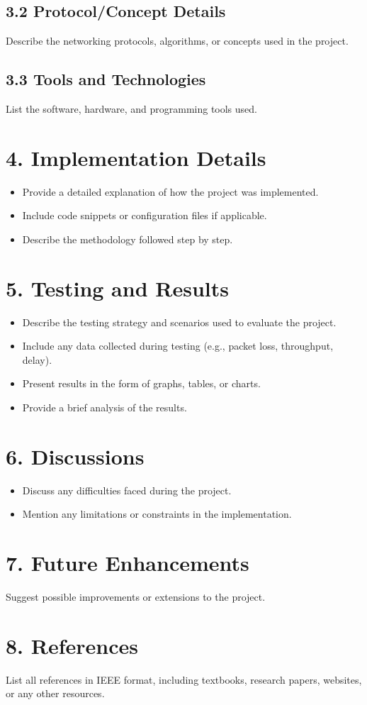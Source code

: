 \documentclass[a4paper,12pt]{article}
\begin{document}
\subsection*{3.2 Protocol/Concept Details}
Describe the networking protocols, algorithms, or concepts used in the project.

\subsection*{3.3 Tools and Technologies}
List the software, hardware, and programming tools used.

\section*{4. Implementation Details}
\begin{itemize}
    \item Provide a detailed explanation of how the project was implemented.
    \item Include code snippets or configuration files if applicable.
    \item Describe the methodology followed step by step.
\end{itemize}

\section*{5. Testing and Results}
\begin{itemize}
    \item Describe the testing strategy and scenarios used to evaluate the project.
    \item Include any data collected during testing (e.g., packet loss, throughput, delay).
    \item Present results in the form of graphs, tables, or charts.
    \item Provide a brief analysis of the results.
\end{itemize}

\section*{6. Discussions}
\begin{itemize}
    \item Discuss any difficulties faced during the project.
    \item Mention any limitations or constraints in the implementation.
\end{itemize}

\section*{7. Future Enhancements}
Suggest possible improvements or extensions to the project.

\section*{8. References}
List all references in IEEE format, including textbooks, research papers, websites, or any other resources.
\end{document}

